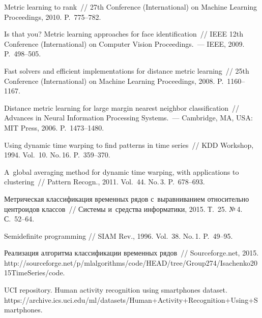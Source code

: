 \begin{multicols}{2}
{{\begin{thebibliography}{99}
Metric learning to rank~// 27th  Conference (International) on Machine
  Learning Proceedings, 2010. P.~775--782.

Is that you? Metric learning approaches for face identification~// 
IEEE 12th  Conference (International) on Computer Vision Proceedings.~--- IEEE, 2009. P.~498--505.

Fast solvers and efficient implementations for distance metric
  learning~// 25th  Conference (International) on Machine
Learning Proceedings, 2008. P.~1160--1167.

Distance metric learning for large margin nearest neighbor
  classification~// Advances in
  Neural Information Processing Systems.~--- Cambridge, MA,
  USA: MIT Press, 2006. P.~1473--1480.

Using dynamic time warping to find patterns in time series~// KDD Workshop, 
1994. Vol.~10. No.\,16. P.~359--370.

A~global averaging method for dynamic time warping, with applications
  to clustering~// Pattern Recogn., 2011. Vol.~44. No.\,3. P.~678--693.

Метрическая классификация временных рядов с~выравниванием
  относительно центроидов классов~// Системы 
  и~средства информатики, 2015. Т.~25. №\,4. С.~52--64.

Semidefinite programming // SIAM Rev., 1996. Vol.~38. No.\,1. P.~49--95.

Реализация алгоритма классификации временных рядов~// Sourceforge.net, 2015.
{\sf http://sourceforge.net/p/mlalgorithms/code/HEAD/\linebreak tree/Group274/Isachenko2015TimeSeries/code}.


UCI repository. Human activity recognition using smartphones dataset.
{\sf https://archive.ics.uci.edu/\linebreak ml/datasets/Human+Activity+Recognition+Using+\linebreak Smartphones}.
\end{thebibliography}

 }
 }

\end{multicols}

